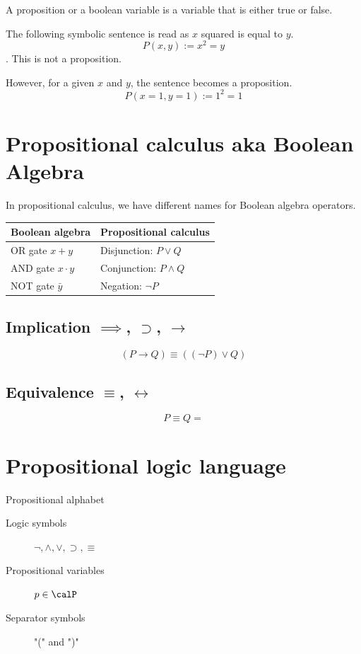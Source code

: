 \begin{definition}
  A proposition or a boolean variable is a variable that is either true or false.
\end{definition}

\begin{example}
  The following symbolic sentence is read as $x$ squared is equal to $y$.
$$ P(x, y) := x^2 = y $$.
This is not a proposition. 

However, for a given $x$ and $y$, the sentence becomes a proposition.
$$P(x=1, y=1) := 1^2 = 1$$
\end{example}

\section{Propositional calculus aka Boolean Algebra}

In propositional calculus, we have different names for Boolean algebra operators.

\begin{tabular}{ll}
  \toprule
  Boolean algebra & Propositional calculus \\
  \midrule
  OR gate $x + y$ & Disjunction: $P \lor Q$ \\
  AND gate $x \cdot y$ & Conjunction: $P \land Q$ \\
  NOT gate $\bar{y}$ & Negation: $\lnot P$ \\
  \bottomrule
\end{tabular}

\subsection{Implication $\implies$, $\supset$, $\rightarrow$ }

$$ (P \rightarrow Q) \equiv ((\neg P) \lor Q)$$

\subsection{Equivalence $\equiv$, $\leftrightarrow$}
$$ P \equiv Q = $$


\section{Propositional logic language}
\begin{definition}{Propositional alphabet}
  \begin{description}
    \item[Logic symbols] $\neg, \land, \lor, \supset, \equiv$
    \item[Propositional variables] $p \in \calP$
    \item[Separator symbols] "("  and ")"
  \end{description}
\end{definition}


